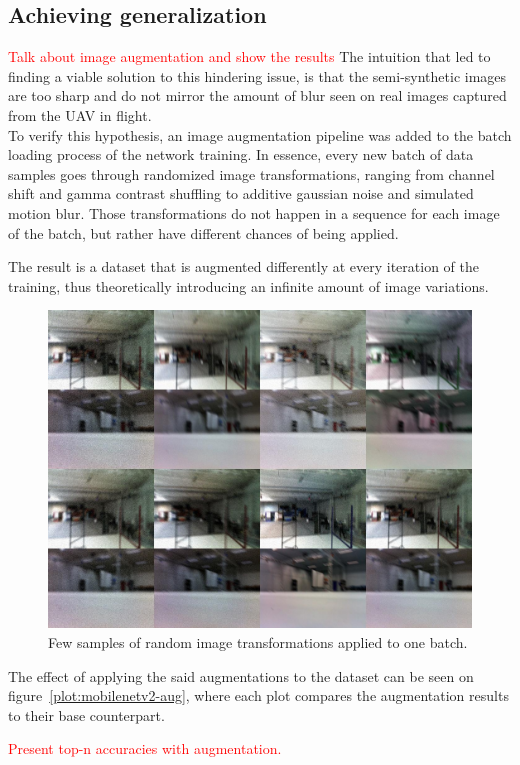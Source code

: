 \subsection{Achieving generalization}

\textcolor{red}{Talk about image augmentation and show the results}
The intuition that led to finding a viable solution to this hindering issue, is
that the semi-synthetic images are too sharp and do not mirror the amount of
blur seen on real images captured from the UAV in flight.\\

To verify this hypothesis, an image augmentation pipeline was added to the
batch loading process of the network training. In essence, every new batch of
data samples goes through randomized image transformations, ranging from
channel shift and gamma contrast shuffling to additive gaussian noise and
simulated motion blur. Those transformations do not happen in a sequence for
each image of the batch, but rather have different chances of being applied.

The result is a dataset that is augmented differently at every iteration of the
training, thus theoretically introducing an infinite amount of image
variations.

\begin{figure}[h]
	\centering
	\includegraphics[width=\textwidth]{figure/augmentation.jpg}
	\caption{Few samples of random image transformations applied to one batch.}
	\label{fig:augmentation}
\end{figure}

The effect of applying the said augmentations to the dataset can be seen on
figure~\ref{plot:mobilenetv2-aug}, where each plot compares the augmentation
results to their base counterpart.



\textcolor{red}{Present top-n accuracies with augmentation.}
